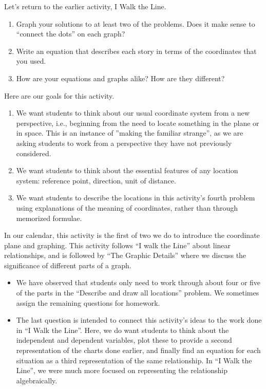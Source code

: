 \documentclass{ximera}
\begin{document}
\begin{problem}
Let's return to the earlier activity, I Walk the Line.
    \begin{enumerate}
        \item Graph your solutions to at least two of the problems.  Does it make sense to ``connect the dots'' on each graph?
        \item Write an equation that describes each story in terms of the coordinates that you used.
        \item How are your equations and graphs alike? How are they different?
    \end{enumerate}    

\end{problem}

\newpage
\begin{instructorNotes}
Here are our goals for this activity.
\begin{enumerate}
\item We want students to think about our usual coordinate system from a new perspective, i.e., beginning from the need to locate something in the plane or in space.  This is an instance of ''making the familiar strange'', as we are asking students to work from a perspective they have not previously considered.
\item  We want students to think about the essential features of any location system: reference point, direction, unit of distance.
\item We want students to describe the locations in this activity's fourth problem using explanations of the meaning of coordinates, rather than through memorized formulae.
\end{enumerate}

In our calendar, this activity is the first of two we do to introduce the coordinate plane and graphing.  This activity follows ``I walk the Line'' about linear relationships, and is followed by ``The Graphic Details'' where we discuss the significance of different parts of a graph.

\begin{itemize}
\item  We have observed that students only need to work through about four or five of the parts in the ``Describe and draw all locations'' problem.  We sometimes assign the remaining questions for homework.
\item  The last question is intended to connect this activity's ideas to the work done in ``I Walk the Line''.  Here, we do want students to think about the independent and dependent variables, plot these to provide a second representation of the charts done earlier, and finally find an equation for each situation as a third representation of the same relationship.  In ``I Walk the Line'', we were much more focused on representing the relationship algebraically.
\end{itemize}




\end{instructorNotes}
\end{document}
